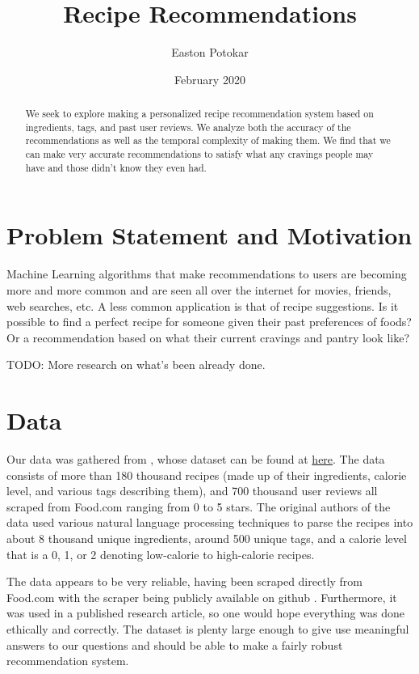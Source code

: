 \documentclass[11pt]{article}
\title{Recipe Recommendations}
\author{Easton Potokar}
\date{February 2020}
\begin{document}
\maketitle

\begin{abstract}
    We seek to explore making a personalized recipe recommendation system based on ingredients, tags, and past user reviews. We analyze both the accuracy of the recommendations as well as the temporal complexity of making them. We find that we can make very accurate recommendations to satisfy what any cravings people may have and those didn't know they even had.
\end{abstract}

\section{Problem Statement and Motivation}
Machine Learning algorithms that make recommendations to users are becoming more and more common and are seen all over the internet for movies, friends, web searches, etc. A less common application is that of recipe suggestions. Is it possible to find a perfect recipe for someone given their past preferences of foods? Or a recommendation based on what their current cravings and pantry look like? 

TODO: More research on what's been already done.

\section{Data}
Our data was gathered from \cite{data}, whose dataset can be found at \href{https://www.kaggle.com/shuyangli94/food-com-recipes-and-user-interactions}{here}. The data consists of more than 180 thousand recipes (made up of their ingredients, calorie level, and various tags describing them), and 700 thousand user reviews all scraped from Food.com ranging from 0 to 5 stars. The original authors of the data used various natural language processing techniques to parse the recipes into about 8 thousand unique ingredients, around 500 unique tags, and a calorie level that is a 0, 1, or 2 denoting low-calorie to high-calorie recipes.

The data appears to be very reliable, having been scraped directly from Food.com with the scraper being publicly available on github \cite{data_scraper}. Furthermore, it was used in a published research article, so one would hope everything was done ethically and correctly. The dataset is plenty large enough to give use meaningful answers to our questions and should be able to make a fairly robust recommendation system. 
\end{document}
